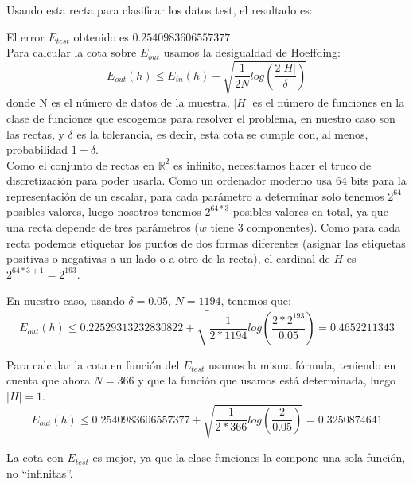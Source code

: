 \documentclass{article}
\begin{document}
Usando esta recta para clasificar los datos test, el resultado es:

\begin{figure}[H]
  \centering
\end{figure}

El error $E_{test}$ obtenido es $0.2540983606557377$.\\

Para calcular la cota sobre $E_{out}$ usamos la desigualdad de Hoeffding:
$$E_{out}(h) \leq E_{in}(h) + \sqrt{\frac{1}{2N}log(\frac{2|H|}{\delta})} $$
donde N es el número de datos de la muestra, $|H|$ es el número de funciones en la clase de funciones que escogemos para resolver el problema, en nuestro caso son las rectas, y $\delta$ es la tolerancia, es decir, esta cota se cumple con, al menos, probabilidad $1-\delta$.\\

Como el conjunto de rectas en $\mathds{R}^2$ es infinito, necesitamos hacer el truco de discretización para poder usarla. Como un ordenador moderno usa $64$ bits para la representación de un escalar, para cada parámetro a determinar solo tenemos $2^{64}$ posibles valores, luego nosotros tenemos $2^{64*3}$ posibles valores en total, ya que una recta depende de tres parámetros ($w$ tiene 3 componentes). Como para cada recta podemos etiquetar los puntos de dos formas diferentes (asignar las etiquetas positivas o negativas a un lado o a otro de la recta), el cardinal de $H$ es $2^{64*3+1} = 2^{193} $.

En nuestro caso, usando $\delta = 0.05$, $N=1194$, tenemos que:
$$E_{out}(h) \leq 0.22529313232830822 + \sqrt{\frac{1}{2*1194}log(\frac{2*2^{193}}{0.05})} = 0.4652211343 $$

Para calcular la cota en función del $E_{test}$ usamos la misma fórmula, teniendo en cuenta que ahora $N=366$ y que la función que usamos está determinada, luego $|H| = 1$.
$$E_{out}(h) \leq 0.2540983606557377 + \sqrt{\frac{1}{2*366}log(\frac{2}{0.05})} = 0.3250874641$$

La cota con $E_{test}$ es mejor, ya que la clase funciones la compone una sola función, no ``infinitas''.
\end{document}
